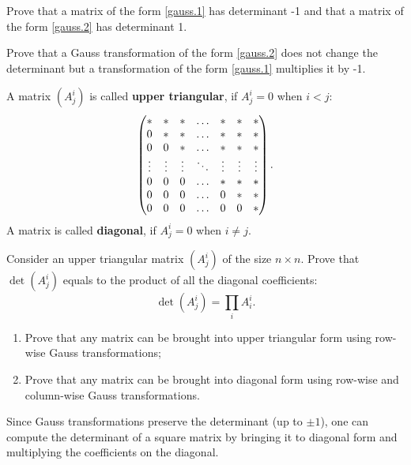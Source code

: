 \documentclass[12pt]{article}
\begin{document}
\begin{zadacha}
Prove that a matrix of the form  \eqref{gauss.1} has determinant -1
and that a matrix of the form \eqref{gauss.2} has determinant 1.
\end{zadacha}

\begin{zadacha}[!]
Prove that a Gauss transformation of the form \eqref{gauss.2}
does not change the determinant but a transformation of the form
\eqref{gauss.1} multiplies it by -1.
\end{zadacha}

\begin{opredelenie}
A matrix $(A^i_j)$ is called {\bf upper triangular},
if $A^i_j=0$ when $i<j$:
$$
\begin{pmatrix}
*&*&* &\hdotsfor{1} &*&*&*\\
0&*&* &\hdotsfor{1} &*&*&*\\
0&0&* &\hdotsfor{1} &*&*&*\\
\vdots&\vdots&\vdots&
\ddots
&\vdots&\vdots&\vdots\\
0&0&0 &\hdotsfor{1} &*&*&*\\
0&0&0 &\hdotsfor{1} &0&*&*\\
0&0&0 &\hdotsfor{1} &0&0&*
\end{pmatrix}.
$$
A matrix is called 
{\bf diagonal}, if $A^i_j=0$ when $i \neq j$.
\end{opredelenie}

\begin{zadacha}[!]
  Consider an upper triangular matrix $(A^i_j)$ of the size $n \times
  n$.  Prove that $\det (A^i_j)$ equals to the product of all the
  diagonal coefficients:
\[ \det (A^i_j) = \prod_i A^i_i.
\]
\end{zadacha}

\begin{zadacha}\label{gss}
\begin{enumerate}
\item Prove that any matrix can be brought into upper triangular form
  using row-wise Gauss transformations; 
\item Prove that any matrix can be brought into diagonal form
  using row-wise and column-wise Gauss transformations.
\end{enumerate}
\end{zadacha}

\begin{zamechanie}
Since Gauss transformations preserve the determinant (up to $\pm 1$),
one can compute the determinant of a square matrix by bringing it to
diagonal form and multiplying the coefficients on the diagonal.
\end{zamechanie}
\end{document}
